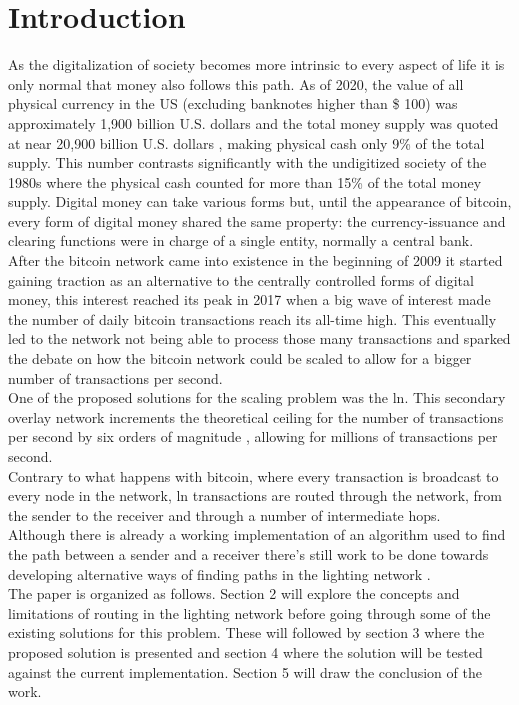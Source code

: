 \section{Introduction}

As the digitalization of society becomes more intrinsic to every aspect of life it is only normal that money also follows this path. As of 2020, the value of all physical currency in the US (excluding banknotes higher than \$ 100) was approximately 1,900 billion U.S. dollars \cite{currcir} and the total money supply was quoted at near 20,900 billion U.S. dollars \cite{mzm}, making physical cash only 9\% of the total supply. This number contrasts significantly with the undigitized society of the 1980s where the physical cash counted for more than 15\% of the total money supply.
Digital money can take various forms but, until the appearance of bitcoin, every form of digital money shared the same property: the currency-issuance and clearing functions were in charge of a single entity, normally a central bank. \\
After the bitcoin network came into existence in the beginning of 2009 \cite{bitcoin} it started gaining traction as an alternative to the centrally controlled forms of digital money, this interest reached its peak in 2017 when a big wave of interest made the number of daily bitcoin transactions reach its all-time high. This eventually led to the network not being able to process those many transactions and sparked the debate on how the bitcoin network could be scaled to allow for a bigger number of transactions per second. \\
One of the proposed solutions for the scaling problem was the \acrfull{ln}. This secondary overlay network increments the theoretical ceiling for the number of transactions per second by six orders of magnitude \cite{lightning_network}, allowing for millions of transactions per second.\\
Contrary to what happens with bitcoin, where every transaction is broadcast to every node in the network, \acrshort{ln} transactions are routed through the network, from the sender to the receiver and through a number of intermediate hops.\\
Although there is already a working implementation of an algorithm used to find the path between a sender and a receiver there's still work to be done towards developing alternative ways of finding paths in the lighting network \cite{trampoline_routing, ant_routing, flare}.\\
The paper is organized as follows. Section 2 will explore the concepts and limitations of routing in the lighting network before going through some of the existing solutions for this problem. These will followed by section 3 where the proposed solution is presented and section 4 where the solution will be tested against the current implementation. Section 5 will draw the conclusion of the work.

